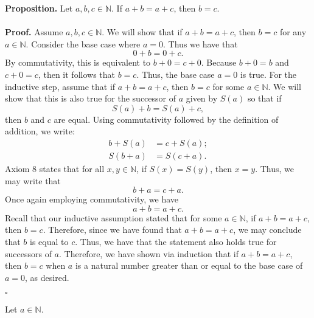 \documentclass[12pt]{exam}
\begin{document}
\begin{questions}


\question
\textbf{Proposition.}  Let $a, b, c \in \mathbb{N}$.  If $a+b = a+c$, then $b=c$. 
\\
\\\textbf{Proof.} Assume $a,b,c \in \mathbb N$. We will show that if $a+b = a+c$, then $b=c$ for any $a \in \mathbb N$. Consider the base case where $a=0$. Thus we have that $$0+b=0+c.$$ By commutativity, this is equivalent to $b+0 = c+0$. Because $b+0 = b$ and $c+0=c$, then it follows that $b=c$. Thus, the base case $a=0$ is true. For the inductive step, assume that if $a+b = a+c$, then $b=c$ for some $a \in \mathbb N$. We will show that this is also true for the successor of $a$ given by $S(a)$ so that if $$S(a) +b  = S(a)+c,$$ then $b$ and $c$ are equal. 
Using commutativity followed by the definition of addition, we write: 
\begin{align*}
b+S(a)  &= c+ S(a) ; \\
S(b+a) &= S(c+a). 
\end{align*}
Axiom 8 states that for all $x,y \in \mathbb N$, if $S(x) = S(y)$, then $x=y$. Thus, we may write that $$b+a= c+a.$$ Once again employing commutativity, we have  $$a+b= a+c.$$ Recall that our inductive assumption stated that for some $a \in \mathbb N$, if $a+b = a+c$, then $b=c$. Therefore, since we have found that $a+b= a+c$, we may conclude that $b$ is equal to $c$. Thus, we have that the statement also holds true for successors of $a$. Therefore, we have shown via induction that if $a+b = a+c$, then $b=c$ when $a$ is a natural number greater than or equal to the base case of $a=0$, as desired.
\begin{flushright}
$\square$
\end{flushright}

\question
Let $a \in \mathbb{N}$. 
\begin{parts}

\end{parts}
\end{questions}
\end{document}
